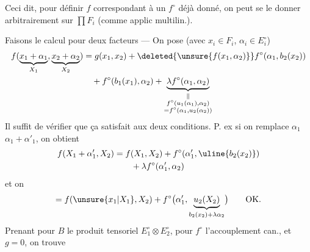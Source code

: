 Ceci dit, pour définir  $f$  correspondant à un $f^\circ$ déjà donné, on peut se le donner arbitrairement  sur $\prod F_i$ (comme applic multilin.).

Faisons le calcul pour deux facteurs ---
On pose (avec $x_i\in F_i$, $\alpha_i\in E_i^\circ$)
\[
\begin{aligned}
f(\underbrace{x_1+\alpha_1}_{X_1},\underbrace{x_2+\alpha_2}_{X_2})
 &=g(x_1,x_2)+\deleted{\unsure{f(x_1,\alpha_2)}}f^\circ(\alpha_1,b_2(x_2))\\
 &\quad+f^\circ(b_1(x_1),\alpha_2)
 +\underbrace{\lambda f^\circ(\alpha_1,\alpha_2)}_{\substack{\Vert\\f^\circ(u_1(\alpha_1),\alpha_2)\\=f^\circ(\alpha_1,u_2(\alpha_2))}}
\end{aligned}
\]
Il suffit de vérifier que ça satisfait aux deux conditions. P. ex si on remplace $\alpha_1$  $\alpha_1+\alpha'_1$, on obtient
\[
\begin{aligned}
f(X_1+\alpha'_1,X_2)&=f(X_1,X_2)+f^\circ(\alpha'_1,\uline{b_2(x_2)})\\
&\qquad+\lambda f^\circ(\alpha'_1,\alpha_2)
\end{aligned}
\]
et on 
\[
=f(\unsure{x_1|X_1},X_2)+f^\circ\bigl(\alpha'_1,\underbrace{u_2(X_2)}_{b_2(x_2)+\lambda\alpha_2}\bigr)\qquad\text{OK.}
\]
Prenant pour $B$ le produit tensoriel $E_1^\circ\otimes E_2^\circ$, pour $f^\circ$ l'accouplement can., et $g=0$, on trouve
